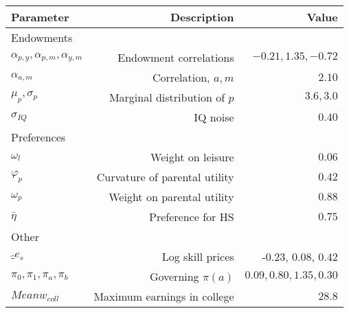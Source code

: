 \begin{tabular}{lrr}
\hline
Parameter & Description  & Value  \\
\hline
Endowments &   &   \\
$\alpha_{p,y}, \alpha_{p,m}, \alpha_{y,m}$ & Endowment correlations  & $-0.21, 1.35, -0.72$  \\
$\alpha_{a,m}$ & Correlation, $a,m$  & $2.10$  \\
$\mu_{p}, \sigma_{p}$ & Marginal distribution of $p$  & $3.6, 3.0$  \\
$\sigma_{IQ}$ & IQ noise  & $0.40$  \\
Preferences &   &   \\
$\omega_{l}$ & Weight on leisure  & $0.06$  \\
$\varphi_{p}$ & Curvature of parental utility  & $0.42$  \\
$\omega_{p}$ & Weight on parental utility  & $0.88$  \\
$\bar{\eta}$ & Preference for HS  & $0.75$  \\
Other &   &   \\
$\hat_{e}_{s}$ & Log skill prices  & -0.23, 0.08, 0.42  \\
$\pi_{0}, \pi_{1}, \pi_{a}, \pi_{b}$ & Governing $\pi(a)$  & $0.09, 0.80, 1.35, 0.30$  \\
$Mean w_{coll}$ & Maximum earnings in college  & $28.8$  \\
\hline
\end{tabular}%
